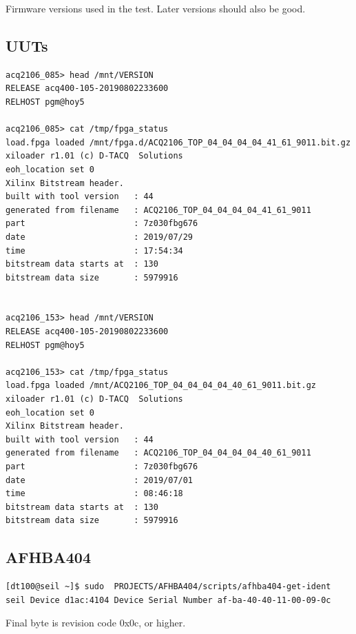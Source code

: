 \documentclass{article}
\begin{document}
Firmware versions used in the test. Later versions should also be good.

\subsection{UUTs}
\begin{verbatim}
acq2106_085> head /mnt/VERSION 
RELEASE acq400-105-20190802233600
RELHOST pgm@hoy5

acq2106_085> cat /tmp/fpga_status 
load.fpga loaded /mnt/fpga.d/ACQ2106_TOP_04_04_04_04_41_61_9011.bit.gz
xiloader r1.01 (c) D‑TACQ  Solutions
eoh_location set 0
Xilinx Bitstream header.
built with tool version   : 44
generated from filename   : ACQ2106_TOP_04_04_04_04_41_61_9011
part                      : 7z030fbg676
date                      : 2019/07/29
time                      : 17:54:34
bitstream data starts at  : 130
bitstream data size       : 5979916


acq2106_153> head /mnt/VERSION 
RELEASE acq400-105-20190802233600
RELHOST pgm@hoy5

acq2106_153> cat /tmp/fpga_status 
load.fpga loaded /mnt/ACQ2106_TOP_04_04_04_04_40_61_9011.bit.gz
xiloader r1.01 (c) D‑TACQ  Solutions
eoh_location set 0
Xilinx Bitstream header.
built with tool version   : 44
generated from filename   : ACQ2106_TOP_04_04_04_04_40_61_9011
part                      : 7z030fbg676
date                      : 2019/07/01
time                      : 08:46:18
bitstream data starts at  : 130
bitstream data size       : 5979916
\end{verbatim}

\subsection{AFHBA404}

\begin{verbatim}
[dt100@seil ~]$ sudo  PROJECTS/AFHBA404/scripts/afhba404-get-ident 
seil Device d1ac:4104 Device Serial Number af-ba-40-40-11-00-09-0c
\end{verbatim}
Final byte is revision code 0x0c, or higher.
\end{document}
